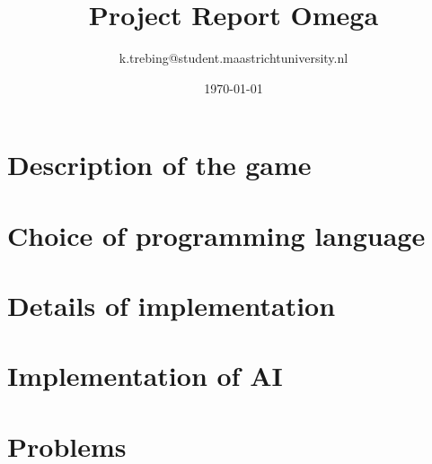 \documentclass[a4paper]{article}
\title{Project Report Omega}
\author{k.trebing@student.maastrichtuniversity.nl}
\date{\today}
\begin{document}
\maketitle

\section{Description of the game}

\section{Choice of programming language}

\section{Details of implementation}

\section{Implementation of AI}

\section{Problems}
\end{document}
